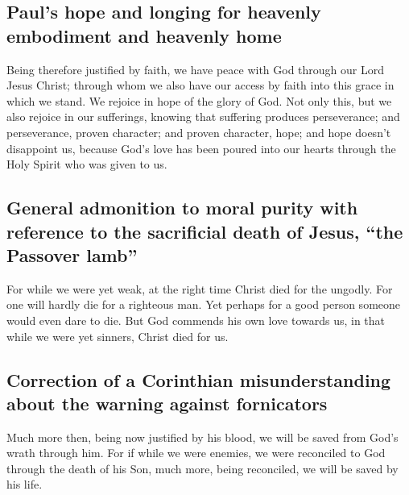 \hypertarget{pauls-hope-and-longing-for-heavenly-embodiment-and-heavenly-home}{%
\subsection{Paul's hope and longing for heavenly embodiment and heavenly
home}\label{pauls-hope-and-longing-for-heavenly-embodiment-and-heavenly-home}}

 Being therefore justified by faith, we have peace with
God through our Lord Jesus Christ;  through whom we also
have our access by faith into this grace in which we stand. We rejoice
in hope of the glory of God.  Not only this, but we also
rejoice in our sufferings, knowing that suffering produces perseverance;
 and perseverance, proven character; and proven character,
hope;  and hope doesn't disappoint us, because God's love
has been poured into our hearts through the Holy Spirit who was given to
us.

\hypertarget{general-admonition-to-moral-purity-with-reference-to-the-sacrificial-death-of-jesus-the-passover-lamb}{%
\subsection{General admonition to moral purity with reference to the
sacrificial death of Jesus, ``the Passover
lamb''}\label{general-admonition-to-moral-purity-with-reference-to-the-sacrificial-death-of-jesus-the-passover-lamb}}

 For while we were yet weak, at the right time Christ died
for the ungodly.  For one will hardly die for a righteous
man. Yet perhaps for a good person someone would even dare to die.
 But God commends his own love towards us, in that while
we were yet sinners, Christ died for us.

\hypertarget{correction-of-a-corinthian-misunderstanding-about-the-warning-against-fornicators}{%
\subsection{Correction of a Corinthian misunderstanding about the
warning against
fornicators}\label{correction-of-a-corinthian-misunderstanding-about-the-warning-against-fornicators}}

 Much more then, being now justified by his blood, we will
be saved from God's wrath through him.  For if while we
were enemies, we were reconciled to God through the death of his Son,
much more, being reconciled, we will be saved by his life.

